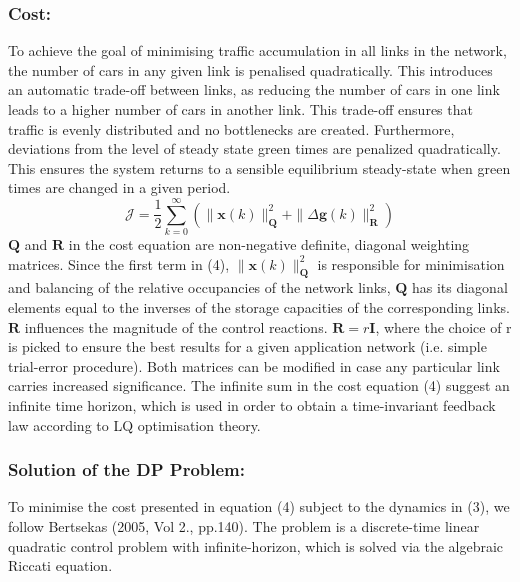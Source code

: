 \documentclass[11pt]{article}
\begin{document}
\subsubsection*{Cost:}
To achieve the goal of minimising traffic accumulation in all links in the network, the number of cars in any given link is penalised quadratically. This introduces an automatic trade-off between links, as reducing the number of cars in one link leads to a higher number of cars in another link. This trade-off ensures that traffic is evenly distributed and no bottlenecks are created. Furthermore, deviations from the level of steady state green times are penalized quadratically. This ensures the system returns to a sensible equilibrium steady-state when green times are changed in a given period.
\begin{equation}
\mathcal{J}=\frac{1}{2} \sum_{k=0}^{\infty}\left(\|\mathbf{x}(k)\|_{\mathbf{Q}}^{2}+\|\Delta \mathbf{g}(k)\|_{\mathbf{R}}^{2}\right)
\end{equation}
$\mathbf{Q}$ and $\mathbf{R}$ in the cost equation are non-negative definite, diagonal weighting matrices. Since the first term in (4), $\|\mathbf{x}(k)\|_{\mathbf{Q}}^{2}$ is responsible for minimisation and balancing of the relative occupancies of the network links, $\mathbf{Q}$ has its diagonal elements equal to the inverses of the storage capacities of the corresponding links. $\mathbf{R}$ influences the magnitude of the control reactions.  $\mathbf{R}=r\mathbf{I}$, where the choice of r is picked to ensure the best results for a given application network (i.e. simple trial-error procedure). Both matrices can be modified in case any particular link carries increased significance. The infinite sum in the cost equation (4) suggest an infinite time horizon, which is used in order to obtain a time-invariant feedback law according to LQ optimisation theory. 

\subsubsection*{Solution of the DP Problem:}
To minimise the cost presented in equation (4) subject to the dynamics in (3), we follow Bertsekas (2005, Vol 2., pp.140). The problem is a discrete-time linear quadratic control problem with infinite-horizon, which is solved via the algebraic Riccati equation. 
\end{document}

